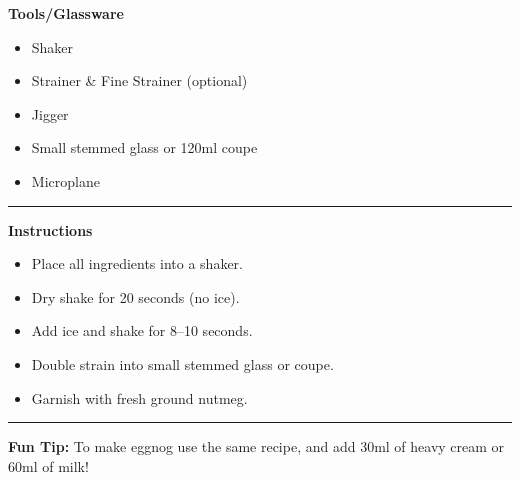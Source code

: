 \hspace{.01\textwidth}\vrule\hspace{.01\textwidth}
\begin{minipage}[t]{.49\textwidth}
    \noindent
    \textbf{\large Tools/Glassware}
    \begin{itemize}
        \item Shaker
        \item Strainer \& Fine Strainer (optional)
        \item Jigger
        \item Small stemmed glass or 120ml coupe
        \item Microplane
    \end{itemize}
\end{minipage}
\vspace{.5em}\hrule\vspace{.5em}
\noindent
\begin{minipage}{\textwidth}
    \noindent
    \textbf{\large Instructions}
    \begin{itemize}
        \item Place all ingredients into a shaker.
        \item Dry shake for 20 seconds (no ice).
        \item Add ice and shake for 8--10 seconds.
        \item Double strain into small stemmed glass or coupe.
        \item Garnish with fresh ground nutmeg.
    \end{itemize}
\end{minipage}
\vspace{.5em}\hrule\vspace{.5em}
\noindent
\textbf{\large Fun Tip:} To make eggnog use the same recipe, and add 30ml of heavy cream or 60ml of milk!
\newpage
